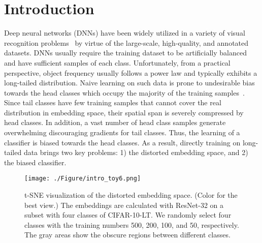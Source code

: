 \documentclass[10pt,twocolumn,letterpaper]{article}
\begin{document}
\section{Introduction} \label{sec:intro}
Deep neural networks (DNNs) have been widely utilized in a variety of visual recognition problems~\cite{he2016deep, he2017mask, ren2016faster, Wang2017NormFace} by virtue of the large-scale, high-quality, and annotated datasets. DNNs usually require the training dataset to be artificially balanced and have sufficient samples of each class. Unfortunately, from a practical perspective, object frequency usually follows a power law and typically exhibits a long-tailed distribution. Naive learning on such data is prone to undesirable bias towards the head classes which occupy the majority of the training samples~\cite{zhang2021survey}. Since tail classes have few training samples that cannot cover the real distribution in embedding space, their spatial span is severely compressed by head classes. In addition, a vast number of head class samples generate overwhelming discouraging gradients for tail classes. Thus, the learning of a classifier is biased towards the head classes. As a result, directly training on long-tailed data brings two key problems: 1) the distorted embedding space, and 2) the biased classifier.

\begin{figure}[t]
\centering
 \texttt{[image: ./Figure/intro\_toy6.png]}
 \caption{t-SNE visualization of the distorted embedding space. (Color for the best view.) The embeddings are calculated with ResNet-32 on a subset with four classes of CIFAR-10-LT. We randomly select four classes with the training numbers 500, 200, 100, and 50, respectively. The gray areas show the obscure regions between different classes.}
 \label{fig:intro-toy}
 \vspace{-6pt}
\end{figure}
\end{document}
